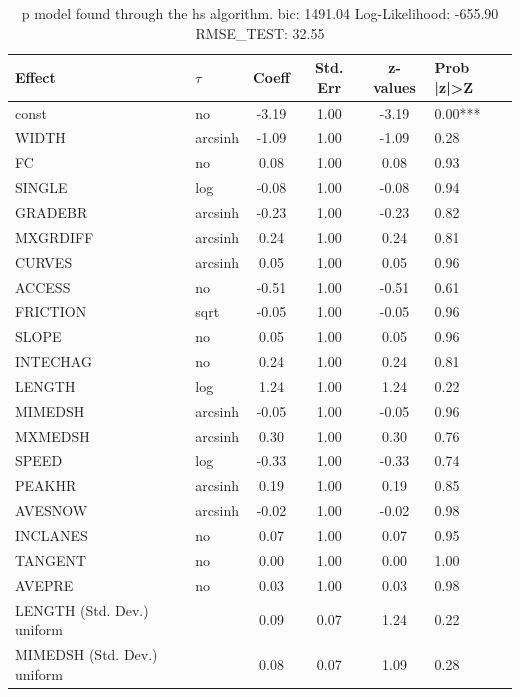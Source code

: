 \begin{table}
	\caption{p model found through the hs algorithm. bic: 1491.04 Log-Likelihood: -655.90 RMSE_TEST: 32.55}
	\begin{center}
		\begin{tabular}{|l|l|c|c|c|l|}
			\hline
			Effect & $\tau$ & Coeff & Std. Err & z-values & Prob |z|>Z \\
			\hline
			const & no & -3.19 & 1.00 & -3.19 & 0.00*** \\
			\hline
			WIDTH & arcsinh & -1.09 & 1.00 & -1.09 & 0.28 \\
			\hline
			FC & no & 0.08 & 1.00 & 0.08 & 0.93 \\
			\hline
			SINGLE & log & -0.08 & 1.00 & -0.08 & 0.94 \\
			\hline
			GRADEBR & arcsinh & -0.23 & 1.00 & -0.23 & 0.82 \\
			\hline
			MXGRDIFF & arcsinh & 0.24 & 1.00 & 0.24 & 0.81 \\
			\hline
			CURVES & arcsinh & 0.05 & 1.00 & 0.05 & 0.96 \\
			\hline
			ACCESS & no & -0.51 & 1.00 & -0.51 & 0.61 \\
			\hline
			FRICTION & sqrt & -0.05 & 1.00 & -0.05 & 0.96 \\
			\hline
			SLOPE & no & 0.05 & 1.00 & 0.05 & 0.96 \\
			\hline
			INTECHAG & no & 0.24 & 1.00 & 0.24 & 0.81 \\
			\hline
			LENGTH & log & 1.24 & 1.00 & 1.24 & 0.22 \\
			\hline
			MIMEDSH & arcsinh & -0.05 & 1.00 & -0.05 & 0.96 \\
			\hline
			MXMEDSH & arcsinh & 0.30 & 1.00 & 0.30 & 0.76 \\
			\hline
			SPEED & log & -0.33 & 1.00 & -0.33 & 0.74 \\
			\hline
			PEAKHR & arcsinh & 0.19 & 1.00 & 0.19 & 0.85 \\
			\hline
			AVESNOW & arcsinh & -0.02 & 1.00 & -0.02 & 0.98 \\
			\hline
			INCLANES & no & 0.07 & 1.00 & 0.07 & 0.95 \\
			\hline
			TANGENT & no & 0.00 & 1.00 & 0.00 & 1.00 \\
			\hline
			AVEPRE & no & 0.03 & 1.00 & 0.03 & 0.98 \\
			\hline
			LENGTH (Std. Dev.) uniform &  & 0.09 & 0.07 & 1.24 & 0.22 \\
			\hline
			MIMEDSH (Std. Dev.) uniform &  & 0.08 & 0.07 & 1.09 & 0.28 \\

\end{tabular}
\end{center}
\end{table}
